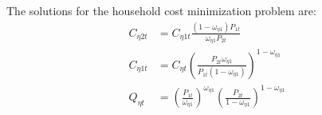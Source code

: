 \documentclass[../thesis.tex]{subfiles}
\begin{document}
\begin{comment}
	Substitute \ref{eq_v2:reg-C-eta-12-t} in \ref{eq_v2:reg-consumption-aggregation}:
	\begin{align}
		C_{\eta t} &= C_{\eta 1 t}^{\omega_{\eta 1}} \left[ C_{\eta 1 t} \frac{(1 - \omega_{\eta 1}) P_{1t}}{\omega_{\eta 1} P_{2t}} \right]^{1-\omega_{\eta 1}} \implies \nonumber \\
		C_{\eta 1 t} &= C_{\eta t} \left( \frac{P_{2t} \omega_{\eta 1}}{P_{1t} (1 - \omega_{\eta 1})} \right)^{1-\omega_{\eta 1}} %
	\end{align}

	Substitute \ref{eq_v2:reg-C-eta1t} and \ref{eq_v2:reg-C-eta2t} in \ref{eq_v2:reg-consumption-aggregation}:
	\begin{align}
		C_{\eta t} &= \left( \frac{\omega_{\eta 1} Q_{\eta t} C_{\eta t}}{P_{1t}} \right)^{\omega_{\eta 1}} \left( \frac{(1 - \omega_{\eta 1}) Q_{\eta t} C_{\eta t}}{P_{2t}} \right)^{1-\omega_{\eta 1}} \implies \nonumber \\
		Q_{\eta t} &= \left( \frac{P_{1 t}}{\omega_{\eta 1}} \right)^{\omega_{\eta 1}} \left( \frac{P_{2 t}}{1 -\omega_{\eta 1}} \right)^{1 -\omega_{\eta 1}} %
	\end{align}

\end{comment}

The solutions for the household cost minimization problem are:
\begin{align}
	C_{\eta 2 t} &= C_{\eta 1 t} \frac{(1 - \omega_{\eta 1}) P_{1t}}{\omega_{\eta 1} P_{2t}} \label{eq_v2:reg-C-eta-12-t} \\
	C_{\eta 1 t} &= C_{\eta t} \left( \frac{P_{2t} \omega_{\eta 1}}{P_{1t} (1 - \omega_{\eta 1})} \right)^{1-\omega_{\eta 1}} \label{eq_v2:reg-C-eta-1-t} \\
	Q_{\eta t} &= \left( \frac{P_{1 t}}{\omega_{\eta 1}} \right)^{\omega_{\eta 1}} \left( \frac{P_{2 t}}{1 -\omega_{\eta 1}} \right)^{1 -\omega_{\eta 1}} \label{eq_v2:reg-total-expense-level}
\end{align}

\begin{comment}
	
		Divide \ref{eq_v2:reg-total-expense-level} of region 1 by region 2:
	\begin{align}
		\frac{Q_{1t}}{Q_{2t}} &= \frac{\left( \frac{P_{1 t}}{\omega_{11}} \right)^{\omega_{11}} \left( \frac{P_{2 t}}{1 -\omega_{11}} \right)^{1 -\omega_{11}}}{\left( \frac{P_{1 t}}{\omega_{21}} \right)^{\omega_{21}} \left( \frac{P_{2 t}}{1 -\omega_{21}} \right)^{1 -\omega_{21}}} \implies \nonumber \\
		\frac{Q_{1t}}{Q_{2t}} &= \frac{\omega_{21}^{\omega_{21}} (1 -\omega_{21})^{1 -\omega_{21}}}{\omega_{11}^{\omega_{11}} (1 - \omega_{11})^{1 - \omega_{11}}} \label{eq_v2:reg-total-expense-level-2}
	\end{align}
	
\end{comment}
\end{document}
